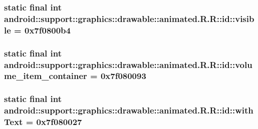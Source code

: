 \hypertarget{classandroid_1_1support_1_1graphics_1_1drawable_1_1animated_1_1_r_1_1id_f725c5f23c35fc928cf53297604e0c05}{
\subsubsection[{visible}]{\setlength{\rightskip}{0pt plus 5cm}static final int android::support::graphics::drawable::animated.R.R::id::visible = 0x7f0800b4}}
\label{classandroid_1_1support_1_1graphics_1_1drawable_1_1animated_1_1_r_1_1id_f725c5f23c35fc928cf53297604e0c05}


\hypertarget{classandroid_1_1support_1_1graphics_1_1drawable_1_1animated_1_1_r_1_1id_3400045b43fdcfb1e21107a488b754a2}{
\subsubsection[{volume\_\-item\_\-container}]{\setlength{\rightskip}{0pt plus 5cm}static final int android::support::graphics::drawable::animated.R.R::id::volume\_\-item\_\-container = 0x7f080093}}
\label{classandroid_1_1support_1_1graphics_1_1drawable_1_1animated_1_1_r_1_1id_3400045b43fdcfb1e21107a488b754a2}


\hypertarget{classandroid_1_1support_1_1graphics_1_1drawable_1_1animated_1_1_r_1_1id_0d428278490e3a3c5fd24174fab45134}{
\subsubsection[{withText}]{\setlength{\rightskip}{0pt plus 5cm}static final int android::support::graphics::drawable::animated.R.R::id::withText = 0x7f080027}}
\label{classandroid_1_1support_1_1graphics_1_1drawable_1_1animated_1_1_r_1_1id_0d428278490e3a3c5fd24174fab45134}


